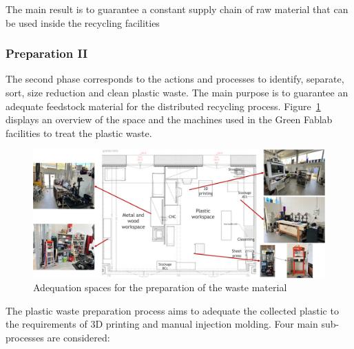 \documentclass[
  11pt,
]{article}
\begin{document}
The main result is to guarantee a constant supply chain of raw material
that can be used inside the recycling facilities

\hypertarget{preparation-ii}{%
\subsubsection{Preparation II}\label{preparation-ii}}

The second phase corresponds to the actions and processes to identify,
separate, sort, size reduction and clean plastic waste. The main purpose
is to guarantee an adequate feedstock material for the distributed
recycling process. Figure~\ref{fig-adequation} displays an overview of
the space and the machines used in the Green Fablab facilities to treat
the plastic waste.

\begin{figure}[H]

{\centering \includegraphics{figures/preparation/adequation.jpg}

}

\caption{\label{fig-adequation}Adequation spaces for the preparation of
the waste material}

\end{figure}

The plastic waste preparation process aims to adequate the collected
plastic to the requirements of 3D printing and manual injection molding.
Four main sub-processes are considered:
\end{document}
